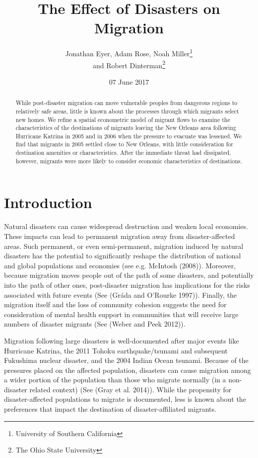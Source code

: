 \documentclass[]{article}
\title{The Effect of Disasters on Migration}
\author{Jonathan Eyer, Adam Rose, Noah Miller\footnote{University of Southern
  California} \\ and Robert Dinterman\footnote{The Ohio State University}}
\date{07 June 2017}
\begin{document}
\maketitle
\begin{abstract}
While post-disaster migration can move vulnerable peoples from dangerous
regions to relatively safe areas, little is known about the processes
through which migrants select new homes. We refine a spatial econometric
model of migrant flows to examine the characteristics of the
destinations of migrants leaving the New Orleans area following
Hurricane Katrina in 2005 and in 2006 when the pressure to evacuate was
lessened. We find that migrants in 2005 settled close to New Orleans,
with little consideration for destination amenities or characteristics.
After the immediate threat had dissipated, however, migrants were more
likely to consider economic characteristics of destinations.
\end{abstract}

\newpage

\section{Introduction}\label{introduction}

Natural disasters can cause widespread destruction and weaken local
economies. These impacts can lead to permanent migration away from
disaster-affected areas. Such permanent, or even semi-permanent,
migration induced by natural disasters has the potential to
significantly reshape the distribution of national and global
populations and economies (see e.g. McIntosh (2008)). Moreover, because
migration moves people out of the path of some disasters, and
potentially into the path of other ones, post-disaster migration has
implications for the risks associated with future events (See (Gráda and
O'Rourke 1997)). Finally, the migration itself and the loss of community
cohesion suggests the need for consideration of mental health support in
communities that will receive large numbers of disaster migrants (See
(Weber and Peek 2012)).

Migration following large disasters is well-documented after major
events like Hurricane Katrina, the 2011 Tohoku earthquake/tsunami and
subsequent Fukushima nuclear disaster, and the 2004 Indian Ocean
tsunami. Because of the pressures placed on the affected population,
disasters can cause migration among a wider portion of the population
than those who migrate normally (in a non-disaster related context) (See
(Gray et al. 2014)). While the propensity for disaster-affected
populations to migrate is documented, less is known about the
preferences that impact the destination of disaster-affiliated migrants.
\end{document}
